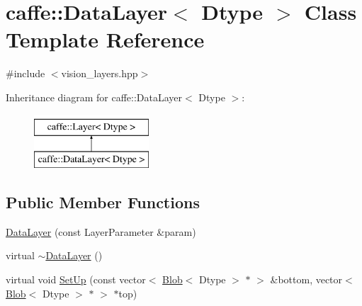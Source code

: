 \hypertarget{classcaffe_1_1_data_layer}{\section{caffe\+:\+:Data\+Layer$<$ Dtype $>$ Class Template Reference}
\label{classcaffe_1_1_data_layer}
}


{\ttfamily \#include $<$vision\+\_\+layers.\+hpp$>$}

Inheritance diagram for caffe\+:\+:Data\+Layer$<$ Dtype $>$\+:\begin{figure}[H]
\begin{center}
\leavevmode
\includegraphics[height=2.000000cm]{classcaffe_1_1_data_layer}
\end{center}
\end{figure}
\subsection*{Public Member Functions}
\begin{DoxyCompactItemize}
\item 
\hyperlink{classcaffe_1_1_data_layer_a55d92ba6737e695551eca610868f1fae}{Data\+Layer} (const Layer\+Parameter \&param)
\item 
virtual \hyperlink{classcaffe_1_1_data_layer_a4fb35db42c400f2503dac67ebbbf21bb}{$\sim$\+Data\+Layer} ()
\item 
virtual void \hyperlink{classcaffe_1_1_data_layer_a157c4ee7c0a8c1b961a80c9a6432c7ea}{Set\+Up} (const vector$<$ \hyperlink{classcaffe_1_1_blob}{Blob}$<$ Dtype $>$ $\ast$ $>$ \&bottom, vector$<$ \hyperlink{classcaffe_1_1_blob}{Blob}$<$ Dtype $>$ $\ast$ $>$ $\ast$top)
\end{DoxyCompactItemize}
